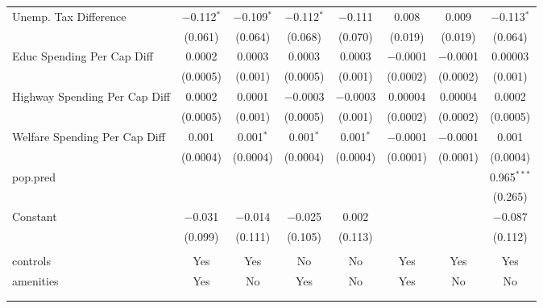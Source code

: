 \begin{table}[!htbp]
\begin{tabular}{@{\extracolsep{5pt}}lccccccc}
  Unemp. Tax Difference & $-$0.112$^{*}$ & $-$0.109$^{*}$ & $-$0.112$^{*}$ & $-$0.111 & 0.008 & 0.009 & $-$0.113$^{*}$ \\ 
  & (0.061) & (0.064) & (0.068) & (0.070) & (0.019) & (0.019) & (0.064) \\ 
  Educ Spending Per Cap Diff & 0.0002 & 0.0003 & 0.0003 & 0.0003 & $-$0.0001 & $-$0.0001 & 0.00003 \\ 
  & (0.0005) & (0.001) & (0.0005) & (0.001) & (0.0002) & (0.0002) & (0.001) \\ 
  Highway Spending Per Cap Diff & 0.0002 & 0.0001 & $-$0.0003 & $-$0.0003 & 0.00004 & 0.00004 & 0.0002 \\ 
  & (0.0005) & (0.001) & (0.0005) & (0.001) & (0.0002) & (0.0002) & (0.0005) \\ 
  Welfare Spending Per Cap Diff & 0.001 & 0.001$^{*}$ & 0.001$^{*}$ & 0.001$^{*}$ & $-$0.0001 & $-$0.0001 & 0.001 \\ 
  & (0.0004) & (0.0004) & (0.0004) & (0.0004) & (0.0001) & (0.0001) & (0.0004) \\ 
  pop.pred &  &  &  &  &  &  & 0.965$^{***}$ \\ 
  &  &  &  &  &  &  & (0.265) \\ 
  Constant & $-$0.031 & $-$0.014 & $-$0.025 & 0.002 &  &  & $-$0.087 \\ 
  & (0.099) & (0.111) & (0.105) & (0.113) &  &  & (0.112) \\ 
 \hline \\[-1.8ex] 
controls & Yes & Yes & No & No & Yes & Yes & Yes \\ 
amenities & Yes & No & Yes & No & Yes & No & No \\ 
\hline \\[-1.8ex] 
\hline 
\hline \\[-1.8ex] 
\end{tabular} 
\end{table} 
